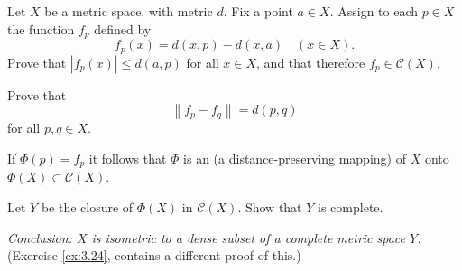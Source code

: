 \begin{myExercise}
    \label{ex:7.24}
    Let $X$ be a metric space, with metric $d$. 
    Fix a point $a \in X$. 
    Assign to each $p \in X$ the function $f_p$ defined by
    \begin{equation*}
        f_p(x) = d(x, p) - d(x, a) \quad (x \in X).
    \end{equation*} 
    Prove that $|f_p (x)| \leq d(a,p)$ for all $x \in X$, 
    and that therefore $f_p \in \mathscr{C}(X)$.
    
    Prove that
    \begin{equation*}
        \left\| f_p-f_q \right\| = d(p, q)
    \end{equation*}
    for all $p, q \in X$. 
    
    If $\Phi(p) = f_p$ it follows that $\Phi$ is an  (a distance-preserving mapping) of $X$ onto $\Phi(X) \subset \mathscr{C}(X)$.
    
    Let $Y$ be the closure of $\Phi(X)$ in $\mathscr{C}(X)$. 
    Show that $Y$ is complete.
    
    \emph{Conclusion: $X$ is isometric to a dense subset of a complete metric space $Y$.}
    (Exercise \ref{ex:3.24}, contains a different proof of this.)
\end{myExercise}


